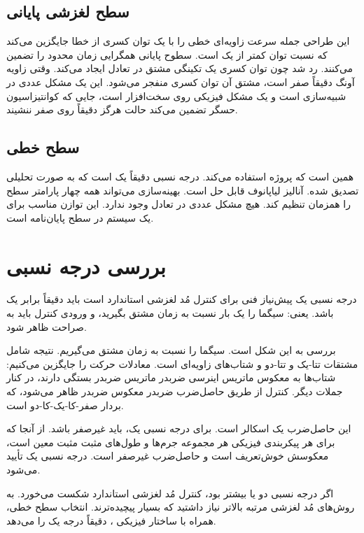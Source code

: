 \documentclass[12pt, a4paper]{article}
\newcommand{\dash}{\lr{---}}
\begin{document}
\subsection{سطح لغزشی پايانی}

اين طراحی جمله سرعت زاويه‌ای خطی را با يک توان کسری از خطا جايگزين می‌کند که نسبت توان کمتر از يک است. سطوح پايانی همگرايی زمان محدود را تضمين می‌کنند. رد شد چون توان کسری يک تکينگی مشتق در تعادل ايجاد می‌کند. وقتی زاويه آونگ دقيقاً صفر است، مشتق آن توان کسری منفجر می‌شود. اين يک مشکل عددی در شبيه‌سازی است و يک مشکل فيزيکی روی سخت‌افزار است، جايی که کوانتيزاسيون حسگر تضمين می‌کند حالت هرگز دقيقاً روی صفر ننشيند.

\subsection{سطح خطی}

همين است که پروژه استفاده می‌کند. درجه نسبی دقيقاً يک است \dash{} که به صورت تحليلی تصديق شده. آناليز لياپانوف قابل حل است. بهينه‌سازی می‌تواند همه چهار پارامتر سطح را همزمان تنظيم کند. هيچ مشکل عددی در تعادل وجود ندارد. اين توازن مناسب برای يک سيستم در سطح پايان‌نامه است.

\section{بررسی درجه نسبی}

درجه نسبی يک پيش‌نياز فنی برای کنترل مُد لغزشی استاندارد است \dash{} بايد دقيقاً برابر يک باشد. يعنی: سيگما را يک بار نسبت به زمان مشتق بگيريد، و ورودی کنترل  بايد به صراحت ظاهر شود.

بررسی به اين شکل است. سيگما را نسبت به زمان مشتق می‌گيريم. نتيجه شامل مشتقات تتا-يک و تتا-دو و شتاب‌های زاويه‌ای است. معادلات حرکت را جايگزين می‌کنيم: شتاب‌ها به معکوس ماتريس اينرسی ضربدر ماتريس  ضربدر  بستگی دارند، در کنار جملات ديگر. کنترل  از طريق حاصل‌ضرب  ضربدر معکوس  ضربدر  ظاهر می‌شود، که  بردار صفر-کا-يک-کا-دو است.

اين حاصل‌ضرب يک اسکالر است. برای درجه نسبی يک، بايد غيرصفر باشد. از آنجا که  برای هر پيکربندی فيزيکی  \dash{} هر مجموعه جرم‌ها و طول‌های مثبت \dash{} مثبت معين است، معکوسش خوش‌تعريف است و حاصل‌ضرب غيرصفر است. درجه نسبی يک تأييد می‌شود.

اگر درجه نسبی دو يا بيشتر بود، کنترل مُد لغزشی استاندارد شکست می‌خورد. به روش‌های مُد لغزشی مرتبه بالاتر نياز داشتيد که بسيار پيچيده‌ترند. انتخاب سطح خطی، همراه با ساختار فيزيکی ، دقيقاً درجه يک را می‌دهد.
\end{document}
